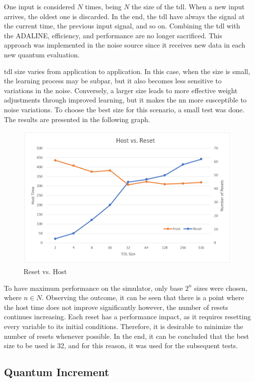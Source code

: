 One input is considered $N$ times, being $N$ the size of the \gls{tdl}. When a new input arrives, the oldest one is discarded. In the end, 
the \gls{tdl} have always the signal at the current time, the previous input signal, and so on. Combining the \gls{tdl} with the ADALINE, 
efficiency, and performance are no longer sacrificed. This approach was implemented in the noise source since it receives new data in each new 
quantum evaluation. 

\gls{tdl} size varies from application to application. In this case, when the size is small, the learning process may be subpar, but it also 
becomes less sensitive to variations in the noise. Conversely, a larger size leads to more effective weight adjustments through improved learning, 
but it makes the \gls{nn} more susceptible to noise variations. To choose the best size for this scenario, a small test was done. The results are 
presented in the following graph.

\begin{figure}[H]
	\centering
 	\includegraphics[width=0.7\linewidth]{Images/ResetVsHost.png}
 	\caption{Reset vs. Host}
	 \label{fig_ResetVsHost}
\end{figure}

To have maximum performance on the simulator, only base $2^{n}$ sizes were chosen, where $n \in N$. Observing the outcome, it can be seen that 
there is a point where the host time does not improve significantly however, the number of resets continues increasing. Each reset has a 
performance impact, as it requires resetting every variable to its initial conditions. Therefore, it is desirable to minimize the number of 
resets whenever possible. In the end, it can be concluded that the best size to be used is 32, and for this reason, it was used for the subsequent 
tests.

\subsection{Quantum Increment}

